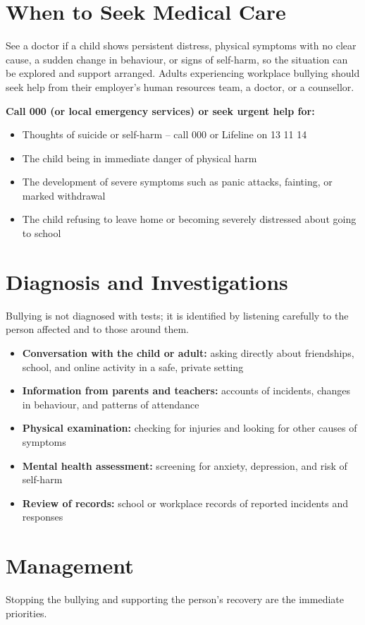 \section*{When to Seek Medical Care}
See a doctor if a child shows persistent distress, physical symptoms with no clear cause, a sudden change in behaviour, or signs of self-harm, so the situation can be explored and support arranged. Adults experiencing workplace bullying should seek help from their employer's human resources team, a doctor, or a counsellor.

\textbf{Call 000 (or local emergency services) or seek urgent help for:}
\begin{itemize}
    \item Thoughts of suicide or self-harm -- call 000 or Lifeline on 13 11 14
    \item The child being in immediate danger of physical harm
    \item The development of severe symptoms such as panic attacks, fainting, or marked withdrawal
    \item The child refusing to leave home or becoming severely distressed about going to school
\end{itemize}

\section*{Diagnosis and Investigations}
Bullying is not diagnosed with tests; it is identified by listening carefully to the person affected and to those around them.

\begin{itemize}
    \item \textbf{Conversation with the child or adult:} asking directly about friendships, school, and online activity in a safe, private setting
    \item \textbf{Information from parents and teachers:} accounts of incidents, changes in behaviour, and patterns of attendance
    \item \textbf{Physical examination:} checking for injuries and looking for other causes of symptoms
    \item \textbf{Mental health assessment:} screening for anxiety, depression, and risk of self-harm
    \item \textbf{Review of records:} school or workplace records of reported incidents and responses
\end{itemize}

\section*{Management}
Stopping the bullying and supporting the person's recovery are the immediate priorities.

